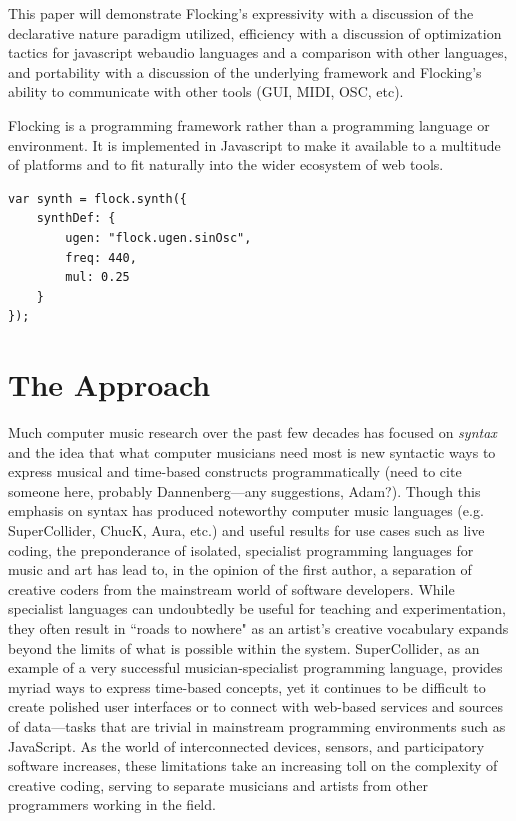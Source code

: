 \documentclass{article}
\begin{document}
This paper will demonstrate Flocking's expressivity with a discussion of the declarative nature paradigm utilized, efficiency with a discussion of optimization tactics for javascript webaudio languages and a comparison with other languages, and portability with a discussion of the underlying framework and Flocking's ability to communicate with other tools (GUI, MIDI, OSC, etc).

Flocking is a programming framework rather than a programming language or environment. It is implemented in Javascript to make it available to a multitude of platforms and to fit naturally into the wider ecosystem of web tools.


\begin{verbatim}
var synth = flock.synth({
    synthDef: {
        ugen: "flock.ugen.sinOsc",
        freq: 440,
        mul: 0.25
    }
});
\end{verbatim}

\section{The Approach}

Much computer music research over the past few decades has focused on {\it syntax} and the idea that what computer musicians need most is new syntactic ways to express musical and time-based constructs programmatically (need to cite someone here, probably Dannenberg---any suggestions, Adam?). Though this emphasis on syntax has produced noteworthy computer music languages (e.g. SuperCollider, ChucK, Aura, etc.) and useful results for use cases such as live coding, the preponderance of isolated, specialist programming languages for music and art has lead to, in the opinion of the first author, a separation of creative coders from the mainstream world of software developers. While specialist languages can undoubtedly be useful for teaching and experimentation, they often result in ``roads to nowhere" as an artist's creative vocabulary expands beyond the limits of what is possible within the system. SuperCollider, as an example of a very successful musician-specialist programming language, provides myriad ways to express time-based concepts, yet it continues to be difficult to create polished user interfaces or to connect with web-based services and sources of data---tasks that are trivial in mainstream programming environments such as JavaScript. As the world of interconnected devices, sensors, and participatory software increases, these limitations take an increasing toll on the complexity of creative coding, serving to separate musicians and artists from other programmers working in the field.
\end{document}
